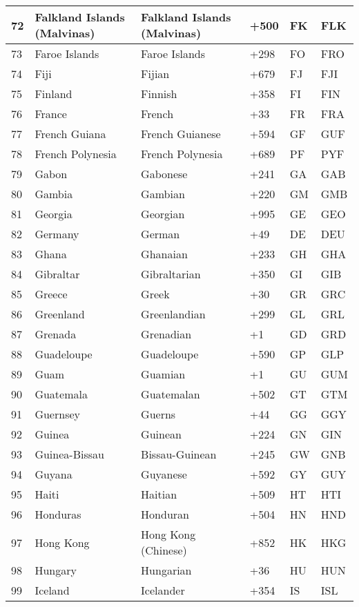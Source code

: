 \begin{longtable}{|l|l|l|l|l|l|}
72 & Falkland Islands (Malvinas) & Falkland Islands (Malvinas) & +500 & FK & FLK \\ \hline 
73 & Faroe Islands & Faroe Islands & +298 & FO & FRO \\ \hline 
74 & Fiji & Fijian & +679 & FJ & FJI \\ \hline 
75 & Finland & Finnish & +358 & FI & FIN \\ \hline 
76 & France & French & +33 & FR & FRA \\ \hline 
77 & French Guiana & French Guianese & +594 & GF & GUF \\ \hline 
78 & French Polynesia & French Polynesia & +689 & PF & PYF \\ \hline 
79 & Gabon & Gabonese & +241 & GA & GAB \\ \hline 
80 & Gambia & Gambian & +220 & GM & GMB \\ \hline 
81 & Georgia & Georgian & +995 & GE & GEO \\ \hline 
82 & Germany & German & +49 & DE & DEU \\ \hline 
83 & Ghana & Ghanaian & +233 & GH & GHA \\ \hline 
84 & Gibraltar & Gibraltarian & +350 & GI & GIB \\ \hline 
85 & Greece & Greek & +30 & GR & GRC \\ \hline 
86 & Greenland & Greenlandian & +299 & GL & GRL \\ \hline 
87 & Grenada & Grenadian & +1 & GD & GRD \\ \hline 
88 & Guadeloupe & Guadeloupe & +590 & GP & GLP \\ \hline 
89 & Guam & Guamian & +1 & GU & GUM \\ \hline 
90 & Guatemala & Guatemalan & +502 & GT & GTM \\ \hline 
91 & Guernsey & Guerns & +44 & GG & GGY \\ \hline 
92 & Guinea & Guinean & +224 & GN & GIN \\ \hline 
93 & Guinea-Bissau & Bissau-Guinean & +245 & GW & GNB \\ \hline 
94 & Guyana & Guyanese & +592 & GY & GUY \\ \hline 
95 & Haiti & Haitian & +509 & HT & HTI \\ \hline 
96 & Honduras & Honduran & +504 & HN & HND \\ \hline 
97 & Hong Kong & Hong Kong (Chinese) & +852 & HK & HKG \\ \hline 
98 & Hungary & Hungarian & +36 & HU & HUN \\ \hline 
99 & Iceland & Icelander & +354 & IS & ISL \\ \hline 

\end{longtable}
